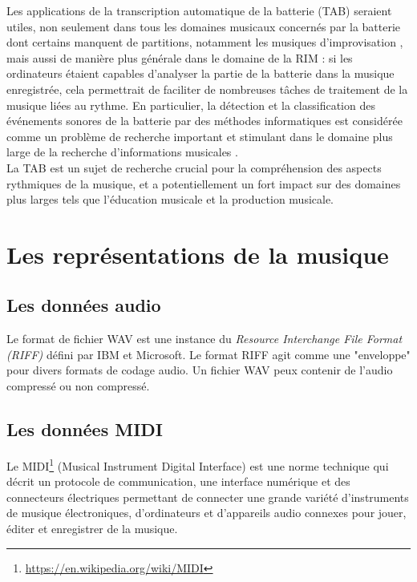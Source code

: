 Les applications de la transcription automatique de la batterie (TAB) seraient
utiles, non seulement dans tous les domaines musicaux concernés par la batterie
dont certains manquent de partitions, notamment les musiques d’improvisation
\cite{future_directions}, mais aussi de manière plus générale dans le domaine
de la RIM : si les ordinateurs étaient capables d’analyser la partie de la
batterie dans la musique enregistrée, cela permettrait de faciliter de
nombreuses tâches de traitement de la musique liées au rythme. En particulier,
la détection et la classification des événements sonores de la batterie par des
méthodes informatiques est considérée comme un problème de recherche important
et stimulant dans le domaine plus large de la recherche d’informations
musicales \cite{Review_ADT}.\\
La TAB est un sujet de recherche crucial pour la compréhension des aspects
rythmiques de la musique, et a potentiellement un fort impact sur des domaines
plus larges tels que l’éducation musicale et la production musicale.

\section{Les représentations de la musique}

\subsection*{Les données audio}
Le format de fichier WAV est une instance du \textit{Resource Interchange File
Format (RIFF)} défini par IBM et Microsoft. Le format RIFF agit comme une
"enveloppe" pour divers formats de codage audio. Un fichier WAV peux contenir
de l’audio compressé ou non compressé. 

\subsection*{Les données MIDI}
Le MIDI\footnote{\url{https://en.wikipedia.org/wiki/MIDI}} (Musical Instrument
Digital Interface) 
est une norme technique qui décrit un protocole de communication, une interface numérique et des connecteurs électriques permettant de connecter une grande variété d’instruments de musique électroniques, d’ordinateurs et d’appareils audio connexes pour jouer, éditer et enregistrer de la musique.

